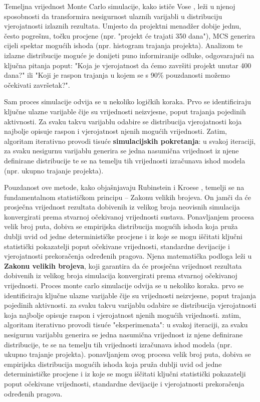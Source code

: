 Temeljna vrijednost Monte Carlo simulacije, kako ističe Vose \cite{Vose2008}, leži u njenoj sposobnosti da transformira nesigurnost ulaznih varijabli u distribuciju vjerojatnosti izlaznih rezultata. Umjesto da projektni menadžer dobije jednu, često pogrešnu, točku procjene (npr. "projekt će trajati 350 dana"), MCS generira cijeli spektar mogućih ishoda (npr. histogram trajanja projekta). Analizom te izlazne distribucije moguće je donijeti puno informiranije odluke, odgovarajući na ključna pitanja poput: "Koja je vjerojatnost da ćemo završiti projekt unutar 400 dana?" ili "Koji je raspon trajanja u kojem se s 90\% pouzdanosti možemo očekivati završetak?".

Sam proces simulacije odvija se u nekoliko logičkih koraka. Prvo se identificiraju ključne ulazne varijable čije su vrijednosti neizvjesne, poput trajanja pojedinih aktivnosti. Za svaku takvu varijablu odabire se distribucija vjerojatnosti koja najbolje opisuje raspon i vjerojatnost njenih mogućih vrijednosti.  Zatim, algoritam iterativno provodi tisuće \textbf{simulacijskih pokretanja}: u svakoj iteraciji, za svaku nesigurnu varijablu generira se jedna nasumična vrijednost iz njene definirane distribucije te se na temelju tih vrijednosti izračunava ishod modela (npr. ukupno trajanje projekta).

Pouzdanost ove metode, kako objašnjavaju Rubinstein i Kroese \cite{Rubinstein2016}, temelji se na fundamentalnom statističkom principu – Zakonu velikih brojeva. On jamči da će prosječna vrijednost rezultata dobivenih iz velikog broja neovisnih simulacija konvergirati prema stvarnoj očekivanoj vrijednosti sustava. Ponavljanjem procesa velik broj puta, dobiva se empirijska distribucija mogućih ishoda koja pruža dublji uvid od jedne determinističke procjene i iz koje se mogu iščitati ključni statistički pokazatelji poput očekivane vrijednosti, standardne devijacije i vjerojatnosti prekoračenja određenih pragova.
Njena matematička podloga leži u \textbf{Zakonu velikih brojeva}, koji garantira da će prosječna vrijednost rezultata dobivenih iz velikog broja simulacija konvergirati prema stvarnoj očekivanoj vrijednosti.
Proces monte carlo simulacije odvija se u nekoliko koraka. prvo se identificiraju ključne ulazne varijable čije su vrijednosti neizvjesne, poput trajanja pojedinih aktivnosti. za svaku takvu varijablu odabire se distribucija vjerojatnosti koja najbolje opisuje raspon i vjerojatnost njenih mogućih vrijednosti. zatim, algoritam iterativno provodi tisuće "eksperimenata": u svakoj iteraciji, za svaku nesigurnu varijablu generira se jedna nasumična vrijednost iz njene definirane distribucije, te se na temelju tih vrijednosti izračunava ishod modela (npr. ukupno trajanje projekta). ponavljanjem ovog procesa velik broj puta, dobiva se empirijska distribucija mogućih ishoda koja pruža dublji uvid od jedne determinističke procjene i iz koje se mogu iščitati ključni statistički pokazatelji poput očekivane vrijednosti, standardne devijacije i vjerojatnosti prekoračenja određenih pragova.

